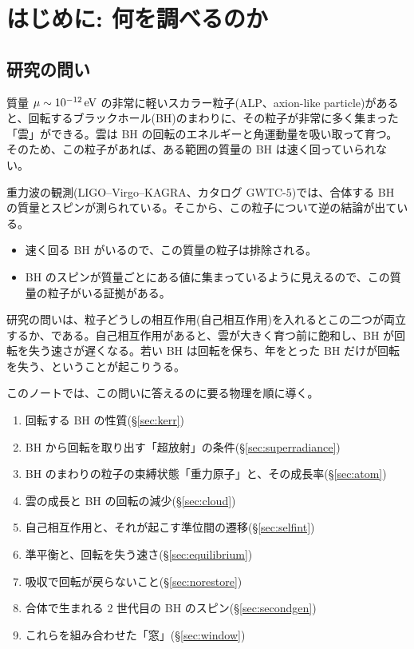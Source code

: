 \section{はじめに: 何を調べるのか}\label{sec:intro}

\subsection{研究の問い}

質量 $\mu\sim10^{-12}\,\mathrm{eV}$ の非常に軽いスカラー粒子(ALP、axion-like particle)があると、回転するブラックホール(BH)のまわりに、その粒子が非常に多く集まった「雲」ができる。雲は BH の回転のエネルギーと角運動量を吸い取って育つ。そのため、この粒子があれば、ある範囲の質量の BH は速く回っていられない。

重力波の観測(LIGO--Virgo--KAGRA、カタログ GWTC-5)では、合体する BH の質量とスピンが測られている。そこから、この粒子について逆の結論が出ている。
\begin{itemize}
\item 速く回る BH がいるので、この質量の粒子は排除される。
\item BH のスピンが質量ごとにある値に集まっているように見えるので、この質量の粒子がいる証拠がある。
\end{itemize}
研究の問いは、粒子どうしの相互作用(自己相互作用)を入れるとこの二つが両立するか、である。自己相互作用があると、雲が大きく育つ前に飽和し、BH が回転を失う速さが遅くなる。若い BH は回転を保ち、年をとった BH だけが回転を失う、ということが起こりうる。

このノートでは、この問いに答えるのに要る物理を順に導く。
\begin{enumerate}
\item 回転する BH の性質(\S\ref{sec:kerr})
\item BH から回転を取り出す「超放射」の条件(\S\ref{sec:superradiance})
\item BH のまわりの粒子の束縛状態「重力原子」と、その成長率(\S\ref{sec:atom})
\item 雲の成長と BH の回転の減少(\S\ref{sec:cloud})
\item 自己相互作用と、それが起こす準位間の遷移(\S\ref{sec:selfint})
\item 準平衡と、回転を失う速さ(\S\ref{sec:equilibrium})
\item 吸収で回転が戻らないこと(\S\ref{sec:norestore})
\item 合体で生まれる 2 世代目の BH のスピン(\S\ref{sec:secondgen})
\item これらを組み合わせた「窓」(\S\ref{sec:window})
\end{enumerate}

